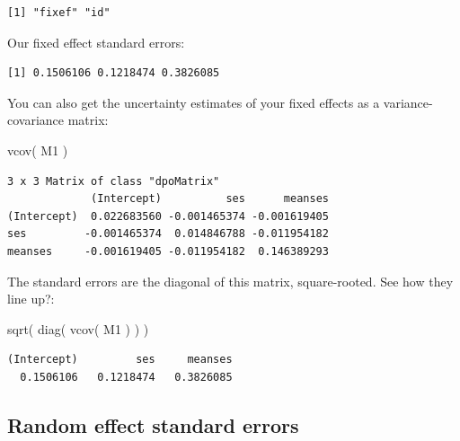 \documentclass[
  letterpaper,
  DIV=11,
  numbers=noendperiod]{scrreprt}
\newenvironment{Shaded}{}{}
\newcommand{\FunctionTok}[1]{\textcolor[rgb]{0.02,0.16,0.49}{#1}}
\newcommand{\NormalTok}[1]{#1}
\newcommand{\SpecialCharTok}[1]{\textcolor[rgb]{0.25,0.44,0.63}{#1}}
\begin{document}
\begin{verbatim}
[1] "fixef" "id"   
\end{verbatim}

Our fixed effect standard errors:

\begin{Shaded}
\end{Shaded}

\begin{verbatim}
[1] 0.1506106 0.1218474 0.3826085
\end{verbatim}

You can also get the uncertainty estimates of your fixed effects as a
variance-covariance matrix:

\begin{Shaded}
\begin{Highlighting}[]
\FunctionTok{vcov}\NormalTok{( M1 )}
\end{Highlighting}
\end{Shaded}

\begin{verbatim}
3 x 3 Matrix of class "dpoMatrix"
             (Intercept)          ses      meanses
(Intercept)  0.022683560 -0.001465374 -0.001619405
ses         -0.001465374  0.014846788 -0.011954182
meanses     -0.001619405 -0.011954182  0.146389293
\end{verbatim}

The standard errors are the diagonal of this matrix, square-rooted. See
how they line up?:

\begin{Shaded}
\begin{Highlighting}[]
\FunctionTok{sqrt}\NormalTok{( }\FunctionTok{diag}\NormalTok{( }\FunctionTok{vcov}\NormalTok{( M1 ) ) )}
\end{Highlighting}
\end{Shaded}

\begin{verbatim}
(Intercept)         ses     meanses 
  0.1506106   0.1218474   0.3826085 
\end{verbatim}

\subsection{Random effect standard
errors}\label{random-effect-standard-errors}
\end{document}
